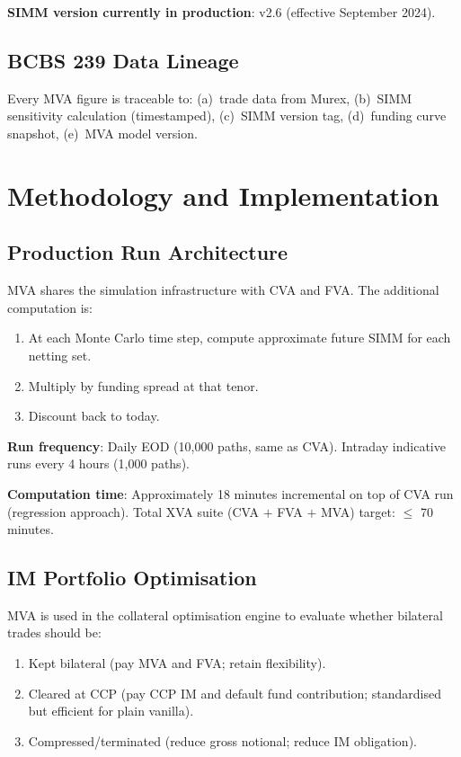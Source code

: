 \documentclass[11pt,a4paper]{article}
\begin{document}
\textbf{SIMM version currently in production}: v2.6 (effective September 2024).

\subsection{BCBS 239 Data Lineage}

Every MVA figure is traceable to: (a)~trade data from Murex, (b)~SIMM sensitivity
calculation (timestamped), (c)~SIMM version tag, (d)~funding curve snapshot, (e)~MVA
model version.

\section{Methodology and Implementation}

\subsection{Production Run Architecture}

MVA shares the simulation infrastructure with CVA and FVA. The additional computation is:
\begin{enumerate}[leftmargin=*]
  \item At each Monte Carlo time step, compute approximate future SIMM for each netting set.
  \item Multiply by funding spread at that tenor.
  \item Discount back to today.
\end{enumerate}

\textbf{Run frequency}: Daily EOD (10,000 paths, same as CVA). Intraday indicative runs every
4 hours (1,000 paths).

\textbf{Computation time}: Approximately 18 minutes incremental on top of CVA run (regression
approach). Total XVA suite (CVA $+$ FVA $+$ MVA) target: $\leq$ 70 minutes.

\subsection{IM Portfolio Optimisation}

MVA is used in the collateral optimisation engine to evaluate whether bilateral trades should be:
\begin{enumerate}[leftmargin=*]
  \item Kept bilateral (pay MVA and FVA; retain flexibility).
  \item Cleared at CCP (pay CCP IM and default fund contribution; standardised but efficient for plain vanilla).
  \item Compressed/terminated (reduce gross notional; reduce IM obligation).
\end{enumerate}
\end{document}
